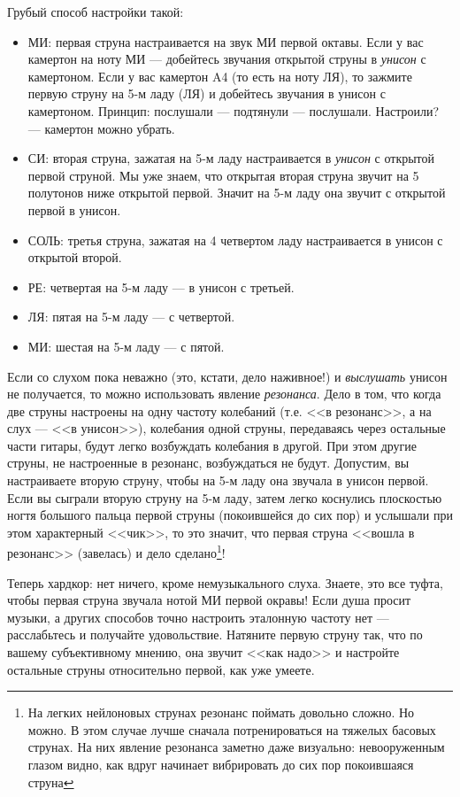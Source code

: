 Грубый способ настройки такой:
\begin{itemize}
    \item МИ: первая струна настраивается на звук МИ первой октавы. Если у вас камертон на ноту МИ --- добейтесь звучания открытой струны в \emph{унисон} с камертоном. Если у вас камертон A4 (то есть на ноту ЛЯ), то зажмите первую струну на 5-м ладу (ЛЯ) и добейтесь звучания в унисон с камертоном. Принцип: послушали --- подтянули --- послушали. Настроили? --- камертон можно убрать.
    \item СИ: вторая струна, зажатая на 5-м ладу настраивается в \emph{унисон} с открытой первой струной. Мы уже знаем, что открытая вторая струна звучит на 5 полутонов ниже открытой первой. Значит на 5-м ладу она звучит с открытой первой в унисон.
    \item СОЛЬ: третья струна, зажатая на 4 четвертом ладу настраивается в унисон с открытой второй.
    \item РЕ: четвертая на 5-м ладу --- в унисон с третьей.
    \item ЛЯ: пятая на 5-м ладу --- с четвертой.
    \item МИ: шестая на 5-м ладу --- с пятой.
\end{itemize}

Если со слухом пока неважно (это, кстати, дело наживное!) и \emph{выслушать} унисон не получается, то можно использовать явление \emph{резонанса}. Дело в том, что когда две струны настроены на одну частоту колебаний (т.е. <<в резонанс>>, а на слух --- <<в унисон>>), колебания одной струны, передаваясь через остальные части гитары, будут легко возбуждать колебания в другой. При этом другие струны, не настроенные в резонанс, возбуждаться не будут. Допустим, вы настраиваете вторую струну, чтобы на 5-м ладу она звучала в унисон первой. Если вы сыграли вторую струну на 5-м ладу, затем легко коснулись плоскостью ногтя большого пальца первой струны (покоившейся до сих пор) и услышали при этом характерный <<чик>>, то это значит, что первая струна <<вошла в резонанс>> (завелась) и дело сделано\footnote{На легких нейлоновых струнах резонанс поймать довольно сложно. Но можно. В этом случае лучше сначала потренироваться на тяжелых басовых струнах. На них явление резонанса заметно даже визуально: невооруженным глазом видно, как вдруг начинает вибрировать до сих пор покоившаяся струна}!

Теперь хардкор: нет ничего, кроме немузыкального слуха. Знаете, это все туфта, чтобы первая струна звучала нотой МИ первой окравы! Если душа просит музыки, а других способов точно настроить эталонную частоту нет --- расслабьтесь и получайте удовольствие. Натяните первую струну так, что по вашему субъективному мнению, она звучит <<как надо>> и настройте остальные струны относительно первой, как уже умеете.

